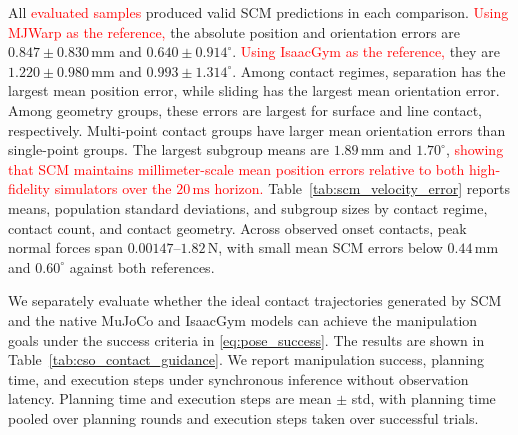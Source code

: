 All  \textcolor{red}{evaluated samples} produced valid SCM predictions in each comparison.  \textcolor{red}{Using MJWarp as the reference,} the absolute position and orientation errors are $0.847\pm0.830\,\mathrm{mm}$ and $0.640\pm0.914^{\circ}$.  \textcolor{red}{Using IsaacGym as the reference,} they are $1.220\pm0.980\,\mathrm{mm}$ and $0.993\pm1.314^{\circ}$. Among contact regimes, separation has the largest mean position error, while sliding has the largest mean orientation error. Among geometry groups, these errors are largest for surface and line contact, respectively. Multi-point contact groups have larger mean orientation errors than single-point groups. The largest subgroup means are $1.89\,\mathrm{mm}$ and $1.70^{\circ}$,  \textcolor{red}{showing that SCM maintains millimeter-scale mean position errors relative to both high-fidelity simulators over the $20\,\mathrm{ms}$ horizon.} Table~\ref{tab:scm_velocity_error} reports means, population standard deviations, and subgroup sizes by contact regime, contact count, and contact geometry. Across observed onset contacts, peak normal forces span $0.00147$--$1.82\,\mathrm{N}$, with small mean SCM errors below $0.44\,\mathrm{mm}$ and $0.60^{\circ}$ against both references.

We separately evaluate whether the ideal contact trajectories generated by SCM and the native MuJoCo and IsaacGym models can achieve the manipulation goals under the success criteria in \eqref{eq:pose_success}. The results are shown in Table~\ref{tab:cso_contact_guidance}.  We report manipulation success, planning time, and execution steps under synchronous inference without observation latency.  Planning time and execution steps are mean $\pm$ std, with planning time pooled over planning rounds and execution steps taken over successful trials. 



